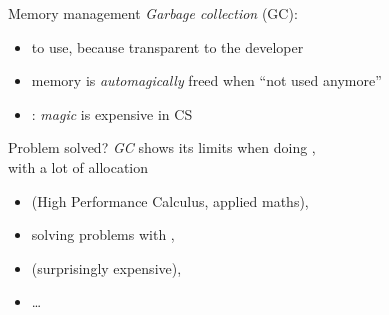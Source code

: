 \documentclass[10pt]{beamer}
\begin{document}
\begin{frame}{Memory management}
  \emph{Garbage collection} (GC):
  \begin{itemize}
    \item {} to use, because transparent to the developer
    \item memory is \emph{automagically} freed when ``not used anymore''
    \item<2-> : \emph{magic} is expensive in CS
  \end{itemize}
  \bigskip{}
  \bigskip
\end{frame}




\begin{frame}{Problem solved?}
  \emph{GC} shows its limits when doing ,\\
  with a lot of allocation
  \bigskip

  \begin{itemize}
    \item {} \hfill (High Performance Calculus, applied maths),
    \item solving problems with ,
    \item {} \hfill (surprisingly expensive),
    \item \ldots
  \end{itemize}
\end{frame}
\end{document}
